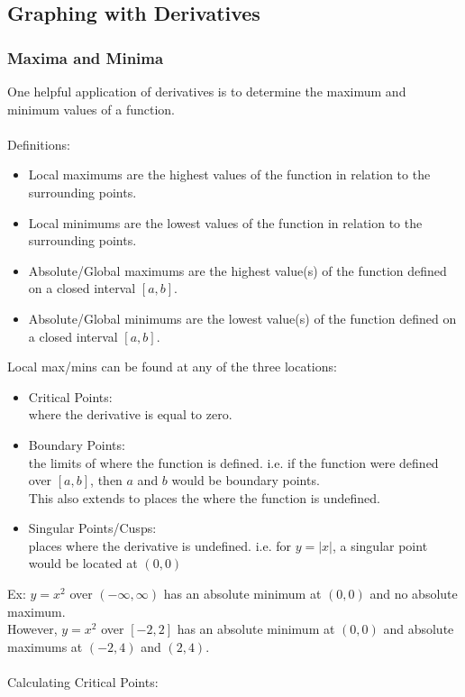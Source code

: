 \subsection{Graphing with Derivatives}

\subsubsection{Maxima and Minima}
One helpful application of derivatives is to determine the maximum and minimum values of a function.\\
\\
Definitions:
\begin{itemize}
    \item Local maximums are the highest values of the function in relation to the surrounding points.
    \item Local minimums are the lowest values of the function in relation to the surrounding points.
    \item Absolute/Global maximums are the highest value(s) of the function defined on a closed interval $[a,b]$.
    \item Absolute/Global minimums are the lowest value(s) of the function defined on a closed interval $[a,b]$.
\end{itemize}
Local max/mins can be found at any of the three locations:
\begin{itemize}
    \item Critical Points:\\
    where the derivative is equal to zero.
    \item Boundary Points:\\
    the limits of where the function is defined. i.e. if the function were defined over $[a,b]$, then $a$ and $b$ would be boundary points.\\
    This also extends to places the where the function is undefined.
    \item Singular Points/Cusps:\\
    places where the derivative is undefined. i.e. for $y=|x|$, a singular point would be located at $(0,0)$
\end{itemize}
Ex: $y=x^2$ over $(-\infty,\infty)$ has an absolute minimum at $(0,0)$ and no absolute maximum.\\
However, $y=x^2$ over $[-2,2]$ has an absolute minimum at $(0,0)$ and absolute maximums at $(-2,4)$ and $(2,4)$.\\
\\
Calculating Critical Points:\\
